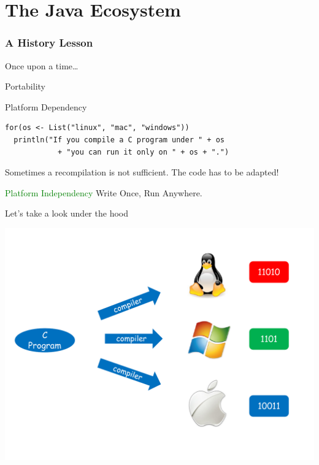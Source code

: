 \part[The Java Ecosystem]{The Java Ecosystem}
\section{A History Lesson}

\begin{frame}{Once upon a time\ldots}
\end{frame}

\begin{frame}[fragile]{Portability}
\begin{block}{\alert{Platform Dependency}}
\begin{lstlisting}
for(os <- List("linux", "mac", "windows"))
  println("If you compile a C program under " + os
            + "you can run it only on " + os + ".")
\end{lstlisting}
\end{block}
\pause
Sometimes a recompilation is not sufficient. \alert{The code} has to be adapted!
\pause
\begin{block}{\textcolor{green}{Platform Independency}}
Write Once, Run Anywhere.
\end{block}
\end{frame}

\begin{frame}{Let's take a look under the hood}
\begin{center}
\includegraphics[scale=0.45]{resources/PlatformDependency.pdf}
\end{center}
\end{frame}

